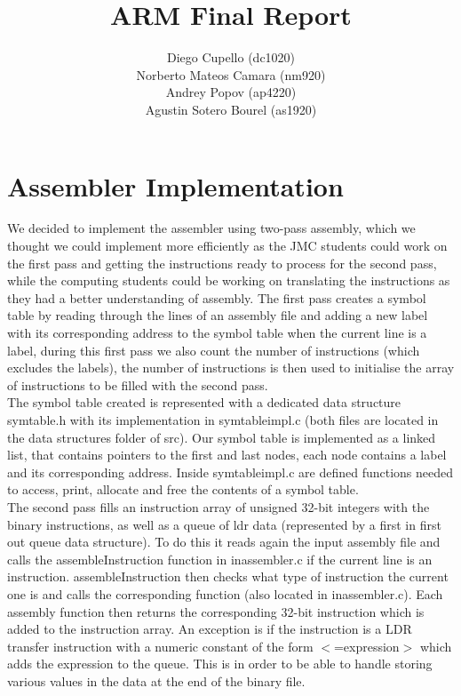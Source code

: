 \documentclass[11pt]{article}
\title{ARM Final Report}
\author{Diego Cupello      (dc1020)\\
Norberto Mateos Camara     (nm920)\\
Andrey Popov               (ap4220)\\
Agustin Sotero Bourel      (as1920)\\}
\begin{document}
\maketitle
\thispagestyle{empty}
\newpage
\setcounter{page}{1}
\section{Assembler Implementation}

We decided to implement the assembler using two-pass assembly, which we thought we could implement more efficiently as the JMC students could work on the first pass and getting the instructions ready to process for the second pass, while the computing students could be working on translating the instructions as they had a better understanding of assembly. The first pass creates a symbol table by reading through the lines of an assembly file and adding a new label with its corresponding address to the symbol table when the current line is a label, during this first pass we also count the number of instructions (which excludes the labels), the number of instructions is then used to initialise the array of instructions to be filled with the second pass. \\

The symbol table created is represented with a dedicated data structure symtable.h with its implementation in symtableimpl.c (both files are located in the data structures folder of src). Our symbol table is implemented as a linked list, that contains pointers to the first and last nodes, each node contains a label and its corresponding address. Inside symtableimpl.c are defined functions needed to access, print, allocate and free the contents of a symbol table. \\

The second pass fills an instruction array of unsigned 32-bit integers with the binary instructions, as well as a queue of ldr data (represented by a first in first out queue data structure). To do this it reads again the input assembly file and calls the assembleInstruction function in inassembler.c if the current line is an instruction. assembleInstruction then checks what type of instruction the current one is and calls the corresponding function (also located in inassembler.c). Each assembly function then returns the corresponding 32-bit instruction which is added to the instruction array. An exception is if the instruction is a LDR transfer instruction with a numeric constant of the form $<$=expression$>$ which adds the expression to the queue. This is in order to be able to handle storing various values in the data at the end of the binary file. \\
\end{document}
